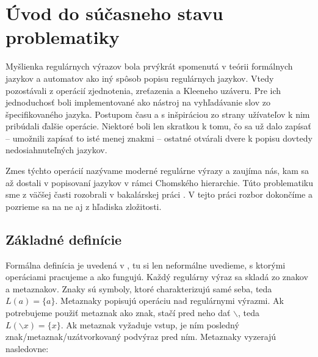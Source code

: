 \chapter[Súčasný stav problematiky]{Úvod do súčasneho stavu problematiky}
\label{chap:uvod}

Myšlienka regulárnych výrazov bola prvýkrát spomenutá v teórii formálnych jazykov a automatov ako iný spôsob popisu regulárnych jazykov. Vtedy pozostávali z operácií zjednotenia, zreťazenia a Kleeneho uzáveru. Pre ich jednoduchosť boli implementované ako nástroj na vyhľadávanie slov zo špecifikovaného jazyka. Postupom času a s inšpiráciou zo strany užívateľov k nim pribúdali ďalšie operácie. Niektoré boli len skratkou k tomu, čo sa už dalo zapísať -- umožnili zapísať to isté menej znakmi -- ostatné otvárali dvere k popisu dovtedy nedosiahnuteľných jazykov.

Zmes týchto operácií nazývame moderné regulárne výrazy a zaujíma nás, kam sa až dostali v popisovaní jazykov v rámci Chomského hierarchie. Túto problematiku sme z väčšej časti rozobrali v bakalárskej práci \cite{mojaBak}. V tejto práci rozbor dokončíme a pozrieme sa na ne aj z hľadiska zložitosti.

\section{Základné definície}
\label{definicie}

Formálna definícia je uvedená v \cite{mojaBak}, tu si len neformálne uvedieme, s ktorými operáciami pracujeme a ako fungujú. Každý regulárny výraz sa skladá zo znakov a metaznakov. Znaky sú symboly, ktoré charakterizujú samé seba, teda $L(a) = \lbrace a \rbrace$. Metaznaky popisujú operáciu nad regulárnymi výrazmi. Ak potrebujeme použiť metaznak ako znak, stačí pred neho dať $\backslash$, teda $L(\backslash x) = \lbrace x \rbrace$. Ak metaznak vyžaduje vstup, je ním posledný znak/metaznak/uzátvorkovaný podvýraz pred ním. Metaznaky vyzerajú nasledovne:

